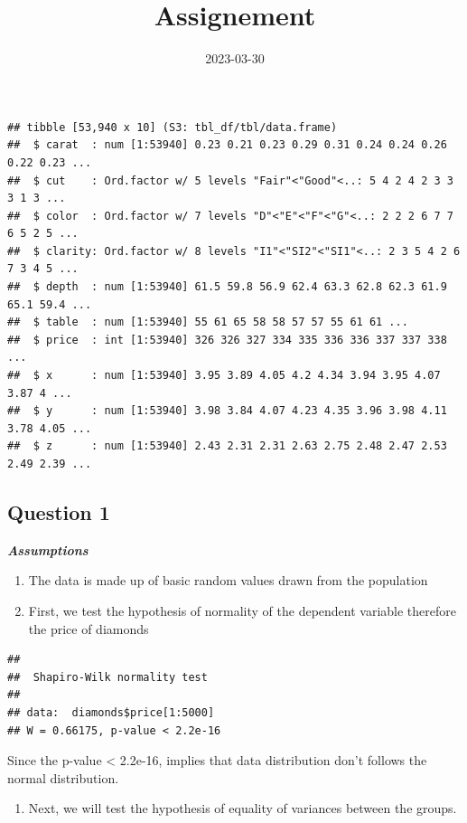 \documentclass[
]{article}
\title{Assignement}
\author{}
\date{\vspace{-2.5em}2023-03-30}
\providecommand{\tightlist}{%
  \setlength{\itemsep}{0pt}\setlength{\parskip}{0pt}}
\begin{document}
\maketitle

\begin{verbatim}
## tibble [53,940 x 10] (S3: tbl_df/tbl/data.frame)
##  $ carat  : num [1:53940] 0.23 0.21 0.23 0.29 0.31 0.24 0.24 0.26 0.22 0.23 ...
##  $ cut    : Ord.factor w/ 5 levels "Fair"<"Good"<..: 5 4 2 4 2 3 3 3 1 3 ...
##  $ color  : Ord.factor w/ 7 levels "D"<"E"<"F"<"G"<..: 2 2 2 6 7 7 6 5 2 5 ...
##  $ clarity: Ord.factor w/ 8 levels "I1"<"SI2"<"SI1"<..: 2 3 5 4 2 6 7 3 4 5 ...
##  $ depth  : num [1:53940] 61.5 59.8 56.9 62.4 63.3 62.8 62.3 61.9 65.1 59.4 ...
##  $ table  : num [1:53940] 55 61 65 58 58 57 57 55 61 61 ...
##  $ price  : int [1:53940] 326 326 327 334 335 336 336 337 337 338 ...
##  $ x      : num [1:53940] 3.95 3.89 4.05 4.2 4.34 3.94 3.95 4.07 3.87 4 ...
##  $ y      : num [1:53940] 3.98 3.84 4.07 4.23 4.35 3.96 3.98 4.11 3.78 4.05 ...
##  $ z      : num [1:53940] 2.43 2.31 2.31 2.63 2.75 2.48 2.47 2.53 2.49 2.39 ...
\end{verbatim}

\hypertarget{question-1}{%
\subsection{Question 1}\label{question-1}}

\textbf{\emph{Assumptions}}

\begin{enumerate}
\def\labelenumi{\arabic{enumi}.}
\item
  The data is made up of basic random values drawn from the population
\item
  First, we test the hypothesis of normality of the dependent variable
  therefore the price of diamonds
\end{enumerate}

\begin{verbatim}
## 
##  Shapiro-Wilk normality test
## 
## data:  diamonds$price[1:5000]
## W = 0.66175, p-value < 2.2e-16
\end{verbatim}

Since the p-value \textless{} 2.2e-16, implies that data distribution
don't follows the normal distribution.

\begin{enumerate}
\def\labelenumi{\arabic{enumi}.}
\setcounter{enumi}{2}
\tightlist
\item
  Next, we will test the hypothesis of equality of variances between the
  groups.
\end{enumerate}
\end{document}
